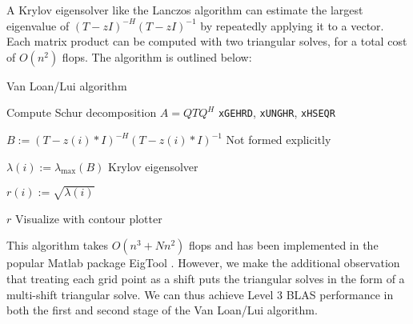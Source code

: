 \documentclass{article}
\begin{document}
A Krylov eigensolver like the Lanczos algorithm can estimate the
largest eigenvalue of \(\left( T-zI \right)^{-H} \left( T-zI
\right)^{-1}\) by repeatedly applying it to a vector. Each matrix
product can be computed with two triangular solves, for a total cost
of \(O(n^2)\) flops. The algorithm is outlined below:
\begin{algorithm}[H]
  \caption{Van Loan/Lui algorithm}
  \label{algorithm:van loan/lui}
  \begin{algorithmic}

    \State Compute Schur decomposition \(A=Q T Q^H\) \Comment \texttt{xGEHRD}, \texttt{xUNGHR}, \texttt{xHSEQR}
    

    \State \(B := \left(T-z(i)*I\right)^{-H} \left(T-z(i)*I\right)^{-1}\)
    \Comment Not formed explicitly

    \State \(\lambda(i) := \lambda_\text{max}\left( B \right)\)
    \Comment Krylov eigensolver

    \State \(r(i) := \sqrt{\lambda(i)}\)

    \EndFor

    \State \Return \(r\) \Comment Visualize with contour plotter

    \EndFunction
  \end{algorithmic}
\end{algorithm}
\noindent
This algorithm takes \(O(n^3+Nn^2)\) flops and has been implemented in
the popular Matlab package EigTool \cite{wright2002eigtool}. However,
we make the additional observation that treating each grid point as a
shift puts the triangular solves in the form of a multi-shift
triangular solve. We can thus achieve Level 3 BLAS performance in both
the first and second stage of the Van Loan/Lui algorithm.
\end{document}

